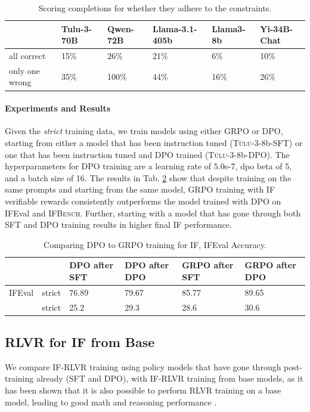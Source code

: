 \documentclass{article}
\newcommand{\benchname}{\textsc{IFBench}\xspace}
\newcommand{\tulu}{\textsc{T\"ulu}\xspace}
\begin{document}
\begin{table}[]
  \caption{Scoring completions for whether they adhere to the constraints.}
  \label{tab:scored_completions}
  \centering
\begin{tabular}{llllll}
    \toprule 
               & Tulu-3-70B & Qwen-72B & Llama-3.1-405b & Llama3-8b & Yi-34B-Chat \\ \midrule
all correct    & 15\%       & 26\%     & 21\%           & 6\%       & 10\%        \\
only one wrong & 35\%       & 100\%    & 44\%           & 16\%      & 26\%  \\ \bottomrule        
\end{tabular}
\end{table}

\paragraph{Experiments and Results}
Given the \textit{strict} training data, we train models using either GRPO or DPO, starting from either a model that has been instruction tuned (\tulu-3-8b-SFT) or one that has been instruction tuned and DPO trained (\tulu-3-8b-DPO). The hyperparameters for DPO training are a learning rate of 5.0e-7, dpo beta of 5, and a batch size of 16. The results in Tab. \ref{tab:dpo_grpo} show that despite training on the same prompts and starting from the same model, GRPO training with IF verifiable rewards consistently outperforms the model trained with DPO on IFEval and \benchname. Further, starting with a model that has gone through both SFT and DPO training results in higher final IF performance.

\begin{table}[]
  \caption{Comparing DPO to GRPO training for IF, IFEval Accuracy.}
  \label{tab:dpo_grpo}
  \centering
\begin{tabular}{llllll}
\toprule
                         &         & DPO after SFT & DPO after DPO & GRPO after SFT & GRPO after DPO \\ \midrule 
\cellcolor{blue!14} IFEval  & strict  & 76.89         & 79.67         & 85.77          & 89.65          \\
\cellcolor{yellow!30}{IFBench} & strict  & 25.2          & 29.3          & 28.6           & 30.6          \\ \bottomrule          
\end{tabular}
\end{table}


\subsection{RLVR for IF from Base}
We compare IF-RLVR training using policy models that have gone through post-training already (SFT and DPO), with IF-RLVR training from base models, as it has been shown that it is also possible to perform RLVR training on a base model, leading to good math and reasoning performance \cite{shao2024deepseekmath, wang2025reinforcement, yang2025qwen3}. 
\end{document}
